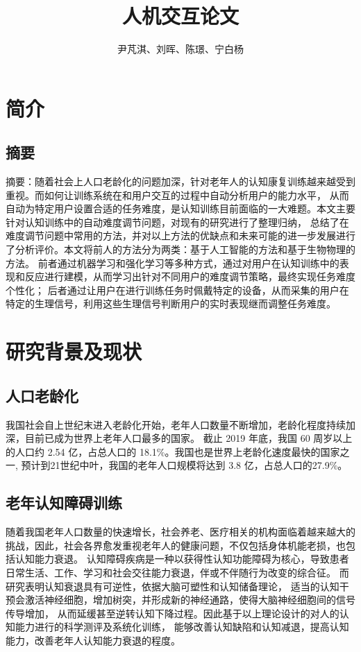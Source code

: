 \documentclass{article}
\author{尹芃淇、刘晖、陈璟、宁白杨}
\title{人机交互论文}
\begin{document}
    \maketitle
    \section{简介}
    \subsection{摘要}
    摘要：随着社会上人口老龄化的问题加深，针对老年人的认知康复训练越来越受到重视。而如何让训练系统在和用户交互的过程中自动分析用户的能力水平，
    从而自动为特定用户设置合适的任务难度，是认知训练目前面临的一大难题。本文主要针对认知训练中的自动难度调节问题，对现有的研究进行了整理归纳，
    总结了在难度调节问题中常用的方法，并对以上方法的优缺点和未来可能的进一步发展进行了分析评价。本文将前人的方法分为两类：基于人工智能的方法和基于生物物理的方法。
    前者通过机器学习和强化学习等多种方式，通过对用户在认知训练中的表现和反应进行建模，从而学习出针对不同用户的难度调节策略，最终实现任务难度个性化；
    后者通过让用户在进行训练任务时佩戴特定的设备，从而采集的用户在特定的生理信号，利用这些生理信号判断用户的实时表现继而调整任务难度。
    \section{研究背景及现状}
        \subsection{人口老龄化}
        我国社会自上世纪末进入老龄化开始，老年人口数量不断增加，老龄化程度持续加深，目前已成为世界上老年人口最多的国家。
        截止 2019 年底，我国 60 周岁以上的人口约 2.54 亿，占总人口的 18.1\%。我国也是世界上老龄化速度最快的国家之一,
        预计到21世纪中叶，我国的老年人口规模将达到 3.8 亿，占总人口的27.9\%。
        
        \subsection{老年认知障碍训练}

        随着我国老年人口数量的快速增长，社会养老、医疗相关的机构面临着越来越大的挑战，因此，社会各界愈发重视老年人的健康问题，不仅包括身体机能老损，也包括认知能力衰退。
        认知障碍疾病是一种以获得性认知功能障碍为核心，导致患者日常生活、工作、学习和社会交往能力衰退，伴或不伴随行为改变的综合征。
        而研究表明认知衰退具有可逆性，依据大脑可塑性和认知储备理论\cite{ref1}，
        适当的认知干预会激活神经细胞，增加树突，并形成新的神经通路，使得大脑神经细胞间的信号传导增加\cite{ref2}，
        从而延缓甚至逆转认知下降过程。因此基于以上理论设计的对人的认知能力进行的科学测评及系统化训练，
        能够改善认知缺陷和认知减退，提高认知能力\cite{ref3, ref4}，改善老年人认知能力衰退的程度。
\end{document}
